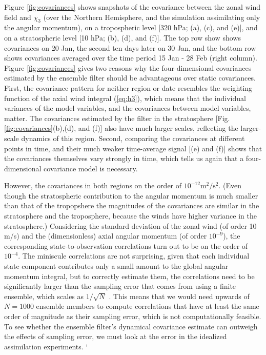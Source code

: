 Figure \ref{fig:covariances} shows snapshots of the covariance between the zonal wind field and $\chi_3$ (over the Northern Hemisphere, and the simulation assimilating only the angular momentum), on a tropospheric level [320 hPa; (a), (c), and (e)], and on a stratospheric level [10 hPa; (b), (d), and (f)].
The top row show shows covariances on 20 Jan, the second ten days later on 30 Jan, and the bottom row shows covariances averaged over the time period 15 Jan - 28 Feb (right column).
Figure \ref{fig:covariances} gives two reasons why the four-dimensional covariances estimated by the ensemble filter should be advantageous over static covariances. 
First, the covariance pattern for neither region or date resembles the weighting function of the axial wind integral (\ref{eq:h3}), which means that the individual variances of the model variables, and the covariances between model variables, matter. 
The covariances estimated by the filter in the stratosphere [Fig. \ref{fig:covariances}(b),(d), and (f)] also have much larger scales, reflecting the larger-scale dynamics of this region. 
Second, comparing the covariances at different points in time, and their 
much weaker time-average signal [(e) and (f)] shows that the covariances themselves vary strongly in time, which tells us again that a four-dimensional covariance model is necessary. 

However, the covariances in both regions on the order of $10^{-12}\text{m}^2/\text{s}^2$.  
(Even though the stratospheric contribution to the angular momentum is much smaller than that of the tropopshere \citep{Rosen1985,Zhou2008} 
the magnitudes of the covariances are similar in the stratosphere and the troposphere, because the winds have higher variance in the stratosphere.) 
Considering the standard deviation of the zonal wind (of order 10 m/s) and the (dimensionless) axial angular momentum (of order $10^{-9}$), the corresponding state-to-observation correlations turn out to be on the order of $10^{-4}$. 
The miniscule correlations are not surprising, given that each individual state component contributes only a small amount to the global angular momentum integral, but to 
correctly estimate them, the correlations need to be significantly larger than the sampling error that comes from using a finite ensemble, which 
scales as $1/\sqrt{N}$ \citep{Houtekamer1998}. 
This means that we would need upwards of $N=1000$ ensemble members to compute correlations that have at least the same order of magnitude as their sampling error, which is not computationally feasible. 
To see whether the ensemble filter's dynamical covariance estimate can outweigh the effects of sampling error, we must look at the error in the idealized assimilation experiments. `

